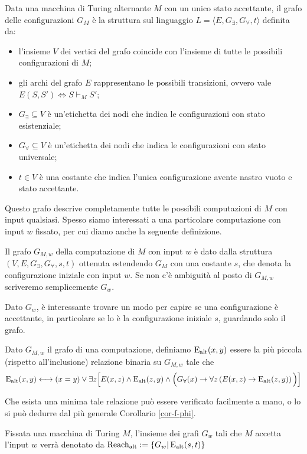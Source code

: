 \begin{definizione}
 Data una macchina di  Turing alternante $M$ con un unico stato accettante,
 il grafo delle configurazioni $G_M$
 è la struttura sul linguaggio $L=\langle E, G_\exists, G_\forall, t\rangle$
 definita da:
 \begin{itemize}
  \item l'insieme $V$ dei vertici del grafo coincide con l'insieme di tutte le
  possibili configurazioni di $M$;
  \item gli archi del grafo $E$ rappresentano le possibili transizioni, ovvero
  vale $E(S,S') \iff S \vdash_M S'$;
  \item $G_\exists \subseteq V$ è un'etichetta dei nodi che indica le configurazioni
  con stato esistenziale;
  \item $G_\forall \subseteq V$ è un'etichetta dei nodi che indica le configurazioni
  con stato universale;
  \item $t \in V$ è una costante che indica l'unica configurazione avente nastro
  vuoto e stato accettante.
 \end{itemize}
\end{definizione}
Questo grafo descrive completamente tutte le possibili computazioni di $M$ con
input qualsiasi. Spesso siamo interessati a una particolare computazione
con input $w$ fissato, per cui diamo anche la seguente definizione.
\begin{definizione}
 Il grafo $G_{M,w}$
 della computazione di $M$ con input $w$ è dato dalla
 struttura $(V,E, G_\exists, G_\forall, s, t)$ ottenuta estendendo $G_M$
 con una costante $s$, che denota la configurazione iniziale con input $w$.
 Se non c'è ambiguità al posto di $G_{M,w}$ scriveremo semplicemente $G_w$.
\end{definizione}
Dato $G_w$, è interessante trovare un modo per capire se una configurazione
è accettante, in particolare se lo è la configurazione iniziale $s$, guardando
solo il grafo.
\begin{definizione}
\label{def:Ealt}
 Dato $G_{M,w}$ il grafo di una computazione,
 definiamo $\operatorname{E_{alt}}(x,y)$ essere la
 più piccola (rispetto all'inclusione) relazione binaria su $G_{M,w}$ tale che
 \[
  \operatorname{E_{alt}}(x,y) \longleftrightarrow (x=y) \lor \exists z 
  \Big[ E(x,z) \land \operatorname{E_{alt}}(z,y) \land \Big(G_\forall(x) \rightarrow \forall z\left(E(x,z) \rightarrow \operatorname{E_{alt}}(z,y)\right)\Big) \Big]
 \]
\end{definizione}
Che esista una minima tale relazione può essere verificato facilmente a mano, o
lo si può dedurre dal più generale Corollario \ref{cor-f-phi}.
\begin{definizione}
\label{def:Ralt}
 Fissata una macchina di Turing $M$,
 l'insieme dei grafi $G_w$ tali che $M$ accetta l'input $w$ verrà denotato da
 $\operatorname{Reach_{alt}} := \{G_w | \operatorname{E_{alt}}(s,t) \}$
\end{definizione}


